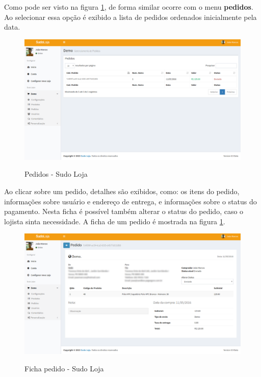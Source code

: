 \documentclass[a4paper,12pt]{monografia}
\begin{document}
Como pode ser visto na figura \ref{fig:pedidos}, de forma similar ocorre com o menu \textbf{pedidos}. Ao selecionar essa opção é exibido a lista de pedidos ordenados inicialmente pela data. 

\begin{figure}[H]
\centering
\caption{Pedidos - Sudo Loja}
\centering
\includegraphics[width=15cm]{img/sistema/pedidos.png.eps}\\
\label{fig:pedidos}
\end{figure}

Ao clicar sobre um pedido, detalhes são exibidos, como: os itens do pedido, informações sobre usuário e endereço de entrega, e informações sobre o status do pagamento. Nesta ficha é possível também alterar o status do pedido, caso o lojista sinta necessidade. A ficha de um pedido é mostrada na figura \ref{fig:pedidos}.

\begin{figure}[H]
\centering
\caption{Ficha pedido - Sudo Loja}
\centering
\includegraphics[width=15cm]{img/sistema/pedido.png.eps}\\
\label{fig:pedido}
\end{figure}
\end{document}

